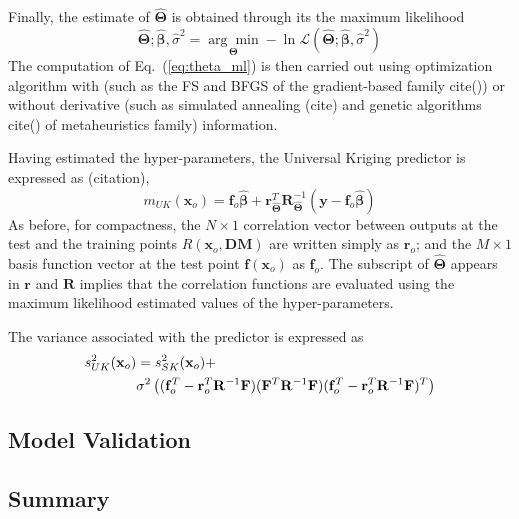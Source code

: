 Finally, the estimate of $\hat{\boldsymbol{\Theta}}$ is obtained through its the maximum likelihood
\begin{equation}
	\hat{\boldsymbol{\Theta}} ; \hat{\boldsymbol{\beta}}, \hat{\sigma}^2 = \underset{\boldsymbol{\Theta}}{\arg\min} - \ln \mathcal{L} (\hat{\boldsymbol{\Theta}};\hat{\boldsymbol{\beta}}, \hat{\sigma}^2)
\label{eq:theta_ml}
\end{equation}
The computation of Eq.~(\ref{eq:theta_ml}) is then carried out using optimization algorithm with (such as the FS and BFGS of the gradient-based family cite()) or without derivative (such as simulated annealing (cite) and genetic algorithms cite() of metaheuristics family) information.


Having estimated the hyper-parameters, the Universal Kriging predictor is expressed as (citation),
\begin{equation}
	m_{UK}(\mathbf{x}_o) = \mathbf{f}_o \hat{\boldsymbol{\beta}} + \mathbf{r}^T_{\hat{\boldsymbol{\Theta}}} \mathbf{R}^{-1}_{\hat{\boldsymbol{\Theta}}} (\mathbf{y} - \mathbf{f}_o \hat{\boldsymbol{\beta}})
\label{eq:uk_predictor}
\end{equation}
As before, for compactness, the $N \times 1$ correlation vector between outputs at the test and the training points $R(\mathbf{x}_o, \mathbf{DM})$ are written simply as $\mathbf{r}_o$;
and the $M \times 1$ basis function vector at the test point $\mathbf{f}(\mathbf{x}_o)$ as $\mathbf{f}_o$.
The subscript of $\hat{\boldsymbol{\Theta}}$ appears in $\mathbf{r}$ and $\mathbf{R}$ implies that the correlation functions are evaluated using the maximum likelihood estimated values of the hyper-parameters.

The variance associated with the predictor is expressed as
\begin{equation}
	\begin{split}
		s^2_{UK}(\mathbf{x}_o) & = s^2_{SK} (\mathbf{x}_o) + \\
			& \medskip \medskip \sigma^2 \left((\mathbf{f}_o^T - \mathbf{r}^T_o \mathbf{R}^{-1} \mathbf{F}) (\mathbf{F}^T \mathbf{R}^{-1} \mathbf{F}) (\mathbf{f}_o^T - \mathbf{r}^T_o \mathbf{R}^{-1} \mathbf{F})^T \right) 
	\end{split}
\label{eq:uk_variance}
\end{equation}

\subsection{Model Validation}\label{sub:gp_validation}

\subsection{Summary}\label{sub:gp_construction_summary}
